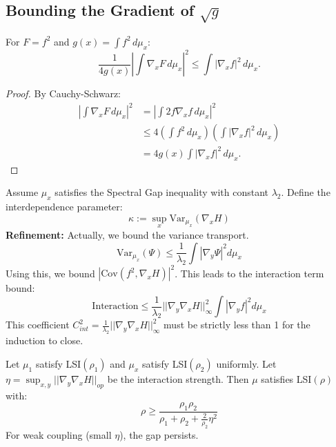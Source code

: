 \subsection{Bounding the Gradient of \texorpdfstring{$\sqrt{g}$}{sqrt(g)}}

\begin{lemma}\label{lem:first-term}
For $F = f^2$ and $g(x) = \int f^2 \, d\mu_x$:
\begin{equation}
    \frac{1}{4g(x)} \left| \int \nabla_x F \, d\mu_x \right|^2 \leq \int |\nabla_x f|^2 \, d\mu_x.
\end{equation}
\end{lemma}

\begin{proof}
By Cauchy-Schwarz:
\begin{align}
    \left| \int \nabla_x F \, d\mu_x \right|^2 &= \left| \int 2f \nabla_x f \, d\mu_x \right|^2 \\
    &\leq 4 \left( \int f^2 \, d\mu_x \right) \left( \int |\nabla_x f|^2 \, d\mu_x \right) \\
    &= 4g(x) \int |\nabla_x f|^2 \, d\mu_x.
\end{align}
\end{proof}

\begin{lemma}\label{lem:cov-term}
Assume $\mu_x$ satisfies the Spectral Gap inequality with constant $\lambda_2$. Define the interdependence parameter:
\begin{equation}
    \kappa := \sup_x \mathrm{Var}_{\mu_x}(\nabla_x H)
\end{equation}
\textbf{Refinement:} Actually, we bound the variance transport.
\begin{equation}
\mathrm{Var}_{\mu_x}(\Psi) \leq \frac{1}{\lambda_2} \int |\nabla_y \Psi|^2 d\mu_x
\end{equation}
Using this, we bound $|\mathrm{Cov}(f^2, \nabla_x H)|^2$.
This leads to the interaction term bound:
\begin{equation}
\text{Interaction} \le \frac{1}{\lambda_2} || \nabla_y \nabla_x H ||_\infty^2 \int |\nabla_y f|^2 d\mu_x
\end{equation}
This coefficient $C_{int}^2 = \frac{1}{\lambda_2} || \nabla_y \nabla_x H ||_\infty^2$ must be strictly less than 1 for the induction to close.
\end{lemma}

\begin{theorem}
Let $\mu_1$ satisfy LSI$(\rho_1)$ and $\mu_x$ satisfy LSI$(\rho_2)$ uniformly.
Let $\eta = \sup_{x,y} || \nabla_y \nabla_x H||_{op}$ be the interaction strength.
Then $\mu$ satisfies LSI$(\rho)$ with:
\begin{equation}
\rho \ge \frac{\rho_1 \rho_2}{\rho_1 + \rho_2 + \frac{2}{\rho_2} \eta^2}
\end{equation}
For weak coupling (small $\eta$), the gap persists.
\end{theorem}

